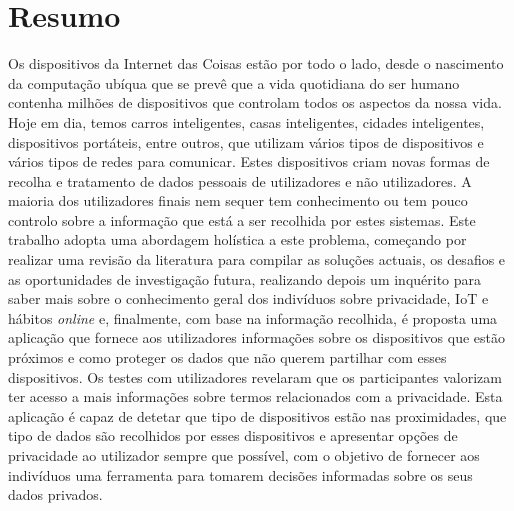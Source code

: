 %
%
\chapter*{Resumo}
\justify

Os dispositivos da Internet das Coisas estão por todo o lado, desde
o nascimento da computação ubíqua que se prevê que a vida quotidiana
do ser humano contenha milhões de dispositivos que controlam todos os
aspectos da nossa vida. Hoje em dia, temos carros inteligentes, casas
inteligentes, cidades inteligentes, dispositivos portáteis, entre
outros, que utilizam vários tipos de dispositivos e vários tipos de
redes para comunicar. Estes dispositivos criam novas formas de recolha
e tratamento de dados pessoais de utilizadores e não utilizadores.
A maioria dos utilizadores finais nem sequer tem conhecimento ou tem
pouco controlo sobre a informação que está a ser recolhida por
estes sistemas. Este trabalho adopta uma abordagem holística a este
problema, começando por realizar uma revisão da literatura para
compilar as soluções actuais, os desafios e as oportunidades de
investigação futura, realizando depois um inquérito para saber mais
sobre o conhecimento geral dos indivíduos sobre privacidade, IoT e
hábitos \textit{online} e, finalmente, com base na informação recolhida,
é proposta uma aplicação que fornece aos utilizadores informações
sobre os dispositivos que estão próximos e como proteger os dados
que não querem partilhar com esses dispositivos.
Os testes com utilizadores revelaram que os participantes valorizam
ter acesso a mais informações sobre termos relacionados com a privacidade.
Esta aplicação é capaz de detetar que tipo de dispositivos estão nas
proximidades, que tipo de dados são recolhidos por esses dispositivos
e apresentar opções de privacidade ao utilizador sempre que possível,
com o objetivo de fornecer aos indivíduos uma ferramenta para tomarem
decisões informadas sobre os seus dados privados.

